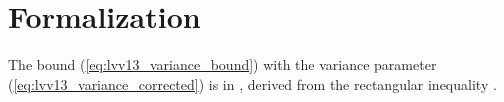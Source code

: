 \documentclass{article}
\begin{document}
\section{Formalization}

The bound (\ref{eq:lvv13_variance_bound}) with the variance parameter
(\ref{eq:lvv13_variance_corrected}) is
 in
, derived from the rectangular
inequality .



\end{document}
